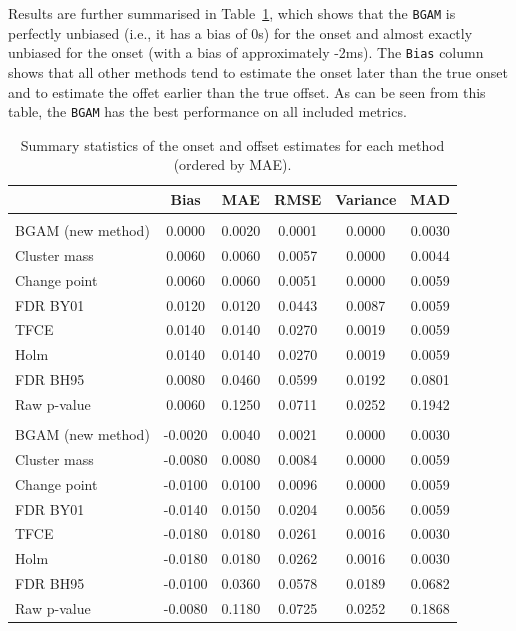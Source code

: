 \documentclass[
  man,
  floatsintext,
  longtable,
  a4paper,
  nolmodern,
  notxfonts,
  notimes,
  colorlinks=true,linkcolor=blue,citecolor=blue,urlcolor=blue]{apa7}
\begin{document}
Results are further summarised in Table~\ref{tbl-simulation-results},
which shows that the \texttt{BGAM} is perfectly unbiased (i.e., it has a
bias of 0s) for the onset and almost exactly unbiased for the onset
(with a bias of approximately -2ms). The \texttt{Bias} column shows that
all other methods tend to estimate the onset later than the true onset
and to estimate the offet earlier than the true offset. As can be seen
from this table, the \texttt{BGAM} has the best performance on all
included metrics.

\begin{table}

{\caption{{Summary statistics of the onset and offset estimates for each
method (ordered by MAE).}{\label{tbl-simulation-results}}}
\vspace{-20pt}}

\fontsize{9.0pt}{10.8pt}\selectfont
\begin{tabular*}{\linewidth}{@{\extracolsep{\fill}}lccccc}
\toprule
 & Bias & MAE & RMSE & Variance & MAD \\ 
\midrule\addlinespace[2.5pt]
\multicolumn{6}{l}{onset} \\[2.5pt] 
\midrule\addlinespace[2.5pt]
BGAM (new method) & 0.0000 & 0.0020 & 0.0001 & 0.0000 & 0.0030 \\ 
Cluster mass & 0.0060 & 0.0060 & 0.0057 & 0.0000 & 0.0044 \\ 
Change point & 0.0060 & 0.0060 & 0.0051 & 0.0000 & 0.0059 \\ 
FDR BY01 & 0.0120 & 0.0120 & 0.0443 & 0.0087 & 0.0059 \\ 
TFCE & 0.0140 & 0.0140 & 0.0270 & 0.0019 & 0.0059 \\ 
Holm & 0.0140 & 0.0140 & 0.0270 & 0.0019 & 0.0059 \\ 
FDR BH95 & 0.0080 & 0.0460 & 0.0599 & 0.0192 & 0.0801 \\ 
Raw p-value & 0.0060 & 0.1250 & 0.0711 & 0.0252 & 0.1942 \\ 
\midrule\addlinespace[2.5pt]
\multicolumn{6}{l}{offset} \\[2.5pt] 
\midrule\addlinespace[2.5pt]
BGAM (new method) & -0.0020 & 0.0040 & 0.0021 & 0.0000 & 0.0030 \\ 
Cluster mass & -0.0080 & 0.0080 & 0.0084 & 0.0000 & 0.0059 \\ 
Change point & -0.0100 & 0.0100 & 0.0096 & 0.0000 & 0.0059 \\ 
FDR BY01 & -0.0140 & 0.0150 & 0.0204 & 0.0056 & 0.0059 \\ 
TFCE & -0.0180 & 0.0180 & 0.0261 & 0.0016 & 0.0030 \\ 
Holm & -0.0180 & 0.0180 & 0.0262 & 0.0016 & 0.0030 \\ 
FDR BH95 & -0.0100 & 0.0360 & 0.0578 & 0.0189 & 0.0682 \\ 
Raw p-value & -0.0080 & 0.1180 & 0.0725 & 0.0252 & 0.1868 \\ 
\bottomrule
\end{tabular*}

\end{table}
\end{document}
